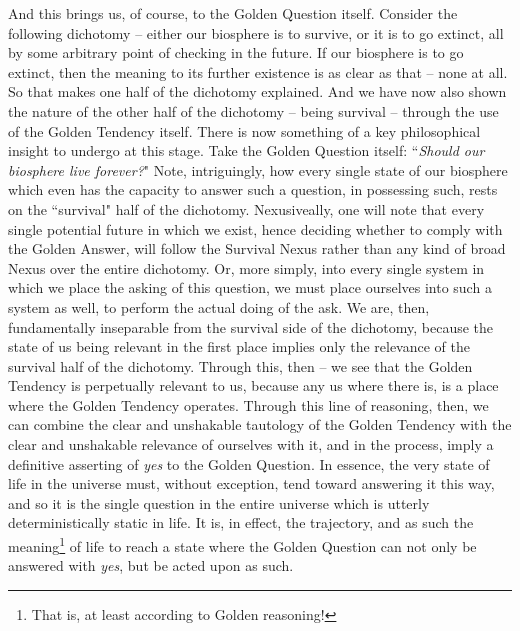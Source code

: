 And this brings us, of course, to the Golden Question itself. Consider the following dichotomy -- either our biosphere is to survive, or it is to go extinct, all by some arbitrary point of checking in the future. If our biosphere is to go extinct, then the meaning to its further existence is as clear as that -- none at all. So that makes one half of the dichotomy explained. And we have now also shown the nature of the other half of the dichotomy -- being survival -- through the use of the Golden Tendency itself. There is now something of a key philosophical insight to undergo at this stage. Take the Golden Question itself: ``\textit{Should our biosphere live forever?}" Note, intriguingly, how every single state of our biosphere which even has the capacity to answer such a question, in possessing such, rests on the ``survival" half of the dichotomy. Nexusiveally, one will note that every single potential future in which we exist, hence deciding whether to comply with the Golden Answer, will follow the Survival Nexus rather than any kind of broad Nexus over the entire dichotomy. Or, more simply, into every single system in which we place the asking of this question, we must place ourselves into such a system as well, to perform the actual doing of the ask. We are, then, fundamentally inseparable from the survival side of the dichotomy, because the state of us being relevant in the first place implies only the relevance of the survival half of the dichotomy. Through this, then -- we see that the Golden Tendency is perpetually relevant to us, because any us where there is, is a place where the Golden Tendency operates. Through this line of reasoning, then, we can combine the clear and unshakable tautology of the Golden Tendency with the clear and unshakable relevance of ourselves with it, and in the process, imply a definitive asserting of \textit{yes} to the Golden Question. In essence, the very state of life in the universe must, without exception, tend toward answering it this way, and so it is the single question in the entire universe which is utterly deterministically static in life. It is, in effect, the trajectory, and as such the meaning\footnote{That is, at least according to Golden reasoning!} of life to reach a state where the Golden Question can not only be answered with \textit{yes}, but be acted upon as such. 


